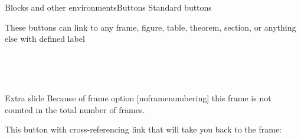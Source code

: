 \documentclass[aspectratio=169, 11pt]{beamer}
\begin{document}
\begin{frame}[label=buttons]{Blocks and other environments}{Buttons}
Standard buttons

	\hyperlink{fig:figure1}{}

	\hyperlink{extraframe}{}


	\beamerreturnbutton{}

\vspace{11pt}
These buttons can link to any frame, figure, table, theorem, section, or anything else with defined label
\end{frame}


\begin{frame}

\centering
\textcolor{white}{Ending frame (version 1)}
\end{frame}


\begin{frame}

\centering
\textcolor{white}{Ending frame (version 2)}
\end{frame}

\appendix
\begin{frame}[noframenumbering,label=extraframe]{Extra slide}
Because of frame option [noframenumbering] this frame is not counted in the total number of frames.

\vspace{24pt}
This button with cross-referencing link that will take you back to the frame: 

\hyperlink{buttons}{}
\end{frame}
\end{document}
